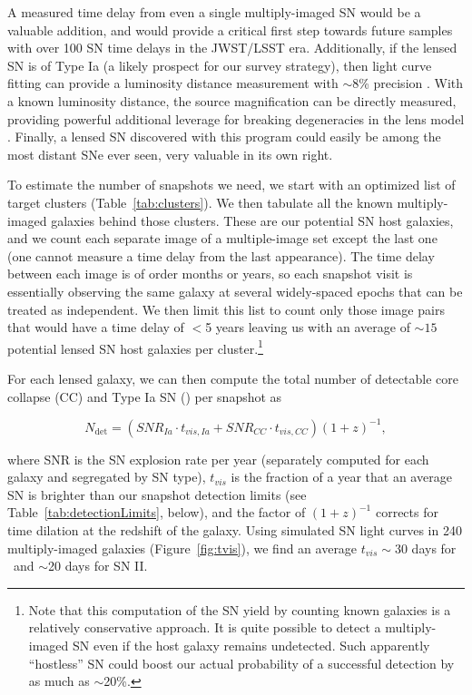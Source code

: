 A measured time delay from even a single multiply-imaged SN would be a
valuable addition, and would provide a critical first step towards
future samples with over 100 SN time delays in the JWST/LSST
era. Additionally, if the lensed SN is of Type Ia (a likely prospect
for our survey strategy), then light curve fitting can provide a
luminosity distance measurement with $\sim$8\%
precision \citep[e.g.][]{Phillips:1993,Jha:2007}. With a known
luminosity distance, the source magnification can be directly
measured, providing powerful additional leverage for breaking
degeneracies in the lens
model \citep{Kolatt:1998,Oguri:2003}. Finally, a lensed SN discovered
with this program could easily be among the most distant SNe ever
seen, very valuable in its own right.



\medskip
{}
To estimate the number of snapshots we need, we start with an
optimized list of target clusters (Table~\ref{tab:clusters}).  We then
tabulate all the known multiply-imaged galaxies behind those clusters.
These are our potential SN host galaxies, and we count each separate
image of a multiple-image set except the last one (one cannot measure
a time delay from the last appearance).  The time delay between each
image is of order months or years, so each snapshot visit is
essentially observing the same galaxy at several widely-spaced epochs
that can be treated as independent.  We then limit this list to count
only those image pairs that would have a time delay of \dt$<$5 years
leaving us with an average of $\sim15$
potential lensed SN host galaxies per cluster.\footnote{Note that this
computation of the SN yield by counting known galaxies is a relatively
conservative approach.  It is quite possible to detect a
multiply-imaged SN even if the host galaxy remains undetected. Such
apparently ``hostless'' SN could boost our actual probability of a
successful detection by as much as $\sim$20\%.}

For each lensed galaxy, we can then compute the total number of
detectable core collapse (CC) and Type Ia SN (\SNIa) per snapshot as

\begin{equation}\label{eq:SNR}
N_{\mbox{det}} = (SNR_{Ia} \cdot t_{vis,Ia} + SNR_{CC} \cdot t_{vis,CC})  (1+z)^{-1},
\end{equation}

\noindent where SNR is the SN explosion rate
per year (separately computed for each galaxy and segregated by SN
type), $t_{vis}$ is the fraction of a year that an average SN is brighter
than our snapshot detection limits (see
Table~\ref{tab:detectionLimits}, below), and the factor of $(1+z)^{-1}$
corrects for time dilation at the redshift of the galaxy.
Using simulated SN light curves in 240 multiply-imaged
galaxies (Figure~\ref{fig:tvis}), we find an average $t_{vis}\sim 30$
days for \SNIa\ and $\sim$20 days for SN II.

